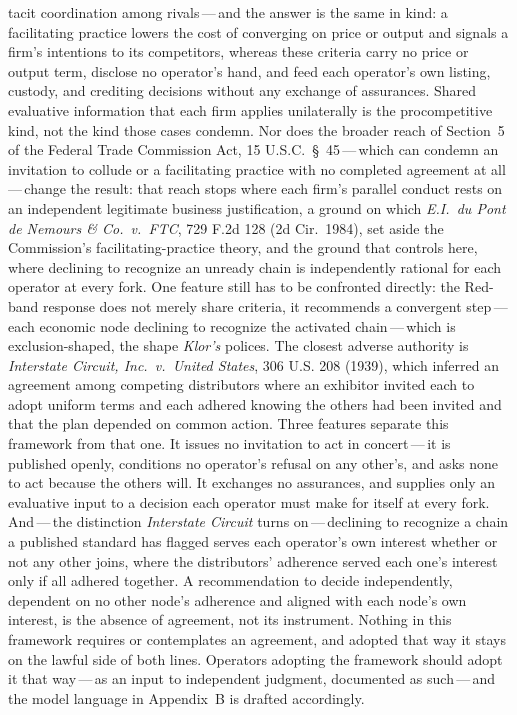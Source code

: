 \documentclass[11pt, twoside, openright]{book}
\begin{document}
tacit coordination among rivals\,---\,and the answer is the same in kind: a facilitating practice lowers the cost of converging on price or output and signals a firm's intentions to its competitors, whereas these criteria carry no price or output term, disclose no operator's hand, and feed each operator's own listing, custody, and crediting decisions without any exchange of assurances. Shared evaluative information that each firm applies unilaterally is the procompetitive kind, not the kind those cases condemn. Nor does the broader reach of Section~5 of the Federal Trade Commission Act, 15 U.S.C.~\S~45\,---\,which can condemn an invitation to collude or a facilitating practice with no completed agreement at all\,---\,change the result: that reach stops where each firm's parallel conduct rests on an independent legitimate business justification, a ground on which \textit{E.I.~du Pont de Nemours \& Co.~v.~FTC}, 729 F.2d 128 (2d Cir.~1984), set aside the Commission's facilitating-practice theory, and the ground that controls here, where declining to recognize an unready chain is independently rational for each operator at every fork. One feature still has to be confronted directly: the Red-band response does not merely share criteria, it recommends a convergent step\,---\,each economic node declining to recognize the activated chain\,---\,which is exclusion-shaped, the shape \textit{Klor's} polices. The closest adverse authority is \textit{Interstate Circuit, Inc.~v.~United States}, 306 U.S. 208 (1939), which inferred an agreement among competing distributors where an exhibitor invited each to adopt uniform terms and each adhered knowing the others had been invited and that the plan depended on common action. Three features separate this framework from that one. It issues no invitation to act in concert\,---\,it is published openly, conditions no operator's refusal on any other's, and asks none to act because the others will. It exchanges no assurances, and supplies only an evaluative input to a decision each operator must make for itself at every fork. And\,---\,the distinction \textit{Interstate Circuit} turns on\,---\,declining to recognize a chain a published standard has flagged serves each operator's own interest whether or not any other joins, where the distributors' adherence served each one's interest only if all adhered together. A recommendation to decide independently, dependent on no other node's adherence and aligned with each node's own interest, is the absence of agreement, not its instrument. Nothing in this framework requires or contemplates an agreement, and adopted that way it stays on the lawful side of both lines. Operators adopting the framework should adopt it that way\,---\,as an input to independent judgment, documented as such\,---\,and the model language in Appendix~B is drafted accordingly.
\end{document}
